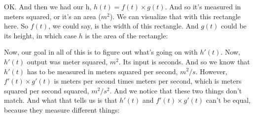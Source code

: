 \documentclass[pdftex, brazil, 12pt, twoside]{article}
\begin{document}
OK.
And then we had our h,
$h(t) = f(t) \times g(t)$.
And so it's measured in meters squared, or it's an area ($m^2$).
We can visualize that with this rectangle here.
So $f(t)$, we could say, is the width of this rectangle.
And $g(t)$ could be its height, in which case $h$ is
the area of the rectangle:

\begin{figure}[H]
  \begin{center}
  \end{center}
\end{figure}

Now, our goal in all of this is to figure out
what's going on with $h'(t)$.
Now, $h'(t)$ output was meter squared, $m^2$.
Its input is seconds.
And so we know that $h'(t)$ has to be measured
in meters squared per second, $m^2/s$.
However, $f'(t) \times g'(t)$ is meters per second times
meters per second, which is meters
squared per second squared, $m^2/s^2$.
And we notice that these two things don't match.
And what that tells us is that $h'(t)$ and $f'(t) \times g'(t)$
can't be equal, because they measure different things:

\begin{figure}[H]
  \begin{center}
  \end{center}
\end{figure}
\end{document}
